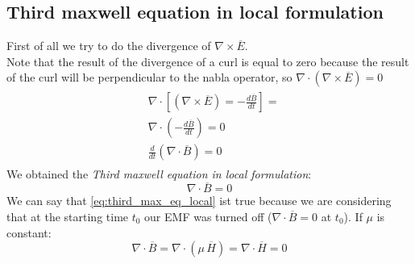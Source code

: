 \subsection*{Third maxwell equation in local formulation}
First of all we try to do the divergence of $\nabla\times\overline{E}$.\\ 
Note that the result of the divergence of a curl is equal to zero because the result of the curl will be perpendicular to the nabla operator, so $\nabla\cdot(\nabla\times\overline{E})=0$
\begin{align}
    \begin{split}
        &\nabla \cdot \left[ (\nabla\times \overline{E})=-\frac{d\overline{B}}{dt}\right]=\\[5pt]
        &\nabla \cdot \left(-\frac{d\overline{B}}{dt}\right)=0\\[5pt]
        &\frac{d}{dt}(\nabla\cdot \overline{B})=0
    \end{split}
\end{align}
We obtained the \emph{Third maxwell equation in local formulation}:
\begin{equation}\label{eq:third_max_eq_local}
    \nabla\cdot \overline{B}=0
\end{equation}
We can say that \cref{eq:third_max_eq_local} ist true because we are considering that at the starting time $t_0$ our EMF was turned off ($\nabla\cdot \overline{B}=0 $ at $t_0$).
If $\mu$ is constant:
\begin{equation}
    \nabla\cdot \overline{B}=\nabla\cdot(\mu\,\overline{H})=\nabla\cdot\overline{H}=0
\end{equation}
